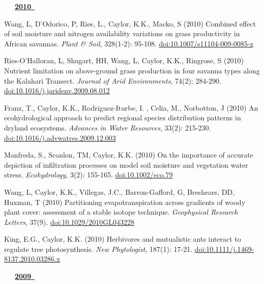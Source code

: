 \begin{etaremune}
\mbox{\ \ \ \underline{\textbf{2010 }}}

\item Wang, L, D'Odorico, P, Ries, L., Caylor, K.K., Macko, S (2010) Combined effect of soil moisture and nitrogen availability variations on grass productivity in African savannas. \emph{Plant \& Soil}, 328(1-2): 95-108. \href{https://doi.org/10.1007/s11104-009-0085-z}{doi:10.1007/s11104-009-0085-z}
\item Ries-O'Halloran, L, Shugart, HH, Wang, L, Caylor, K.K., Ringrose, S (2010) Nutrient limitation on above-ground grass production in four savanna types along the Kalahari Transect. \emph{Journal of Arid Environments}, 74(2): 284-290. \href{https://doi.org/10.1016/j.jaridenv.2009.08.012}{doi:10.1016/j.jaridenv.2009.08.012}
\item Franz, T., Caylor, K.K., Rodriguez-Iturbe, I. , Celia, M., Norbotton, J (2010) An ecohydrological approach to  predict regional species distribution patterns in dryland ecosystems. \emph{Advances in Water Resources}, 33(2): 215-230. \href{https://doi.org/10.1016/j.advwatres.2009.12.003}{doi:10.1016/j.advwatres.2009.12.003}
\item Manfreda, S., Scanlon, TM, Caylor, K.K. (2010) On the importance of accurate depiction of infiltration processes on model soil moisture and vegetation water stress. \emph{Ecohydrology}, 3(2): 155-165. \href{https://doi.org/10.1002/eco.79}{doi:10.1002/eco.79}
\item Wang, L, Caylor, K.K., Villegas, J.C., Barron-Gafford, G, Breshears, DD, Huxman, T (2010) Partitioning evapotranspiration across gradients of woody plant cover: assessment of a stable isotope technique. \emph{Geophysical Research Letters}, 37(9). \href{https://doi.org/10.1029/2010GL043228}{doi:10.1029/2010GL043228}
\item King, E.G., Caylor, K.K. (2010) Herbivores and mutualistic ants interact to regulate tree photosynthesis. \emph{New Phytologist}, 187(1): 17-21. \href{https://doi.org/10.1111/j.1469-8137.2010.03286.x}{doi:10.1111/j.1469-8137.2010.03286.x}

\mbox{\ \ \ \underline{\textbf{2009 }}}


\end{etaremune}
